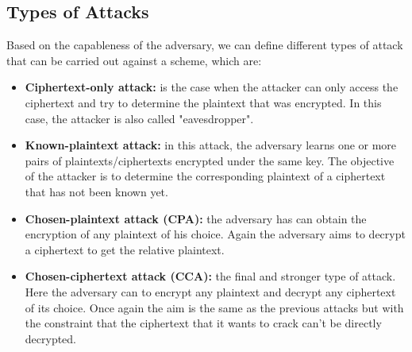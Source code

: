 \subsection{Types of Attacks}
Based on the capableness of the adversary, we can define different types of attack that can be carried out against a scheme, which are:
\begin{itemize}
    \item{\textbf{Ciphertext-only attack:} is the case when the attacker can only access the ciphertext and try to determine the plaintext that was encrypted. In this case, the attacker is also called "eavesdropper".}
    \item{\textbf{Known-plaintext attack:} in this attack, the adversary learns one or more pairs of plaintexts/ciphertexts encrypted under the same key. The objective of the attacker is to determine the corresponding plaintext of a ciphertext that has not been known yet.}
    \item{\textbf{Chosen-plaintext attack (CPA):} the adversary has can obtain the encryption of any plaintext of his choice. Again the adversary aims to decrypt a ciphertext to get the relative plaintext.}
    \item{\textbf{Chosen-ciphertext attack (CCA):} the final and stronger type of attack. Here the adversary can to encrypt any plaintext and decrypt any ciphertext of its choice. Once again the aim is the same as the previous attacks but with the constraint that the ciphertext that it wants to crack can't be directly decrypted.}
\end{itemize}
